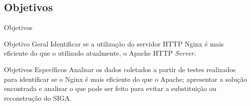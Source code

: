 \subsection*{Objetivos}
\begin{frame}{Objetivos}
	\begin{block}{Objetivo Geral}
		Identificar se a utilização do servidor HTTP Nginx é mais eficiente do 
		que o utilizado atualmente, o Apache HTTP \textit{Server}.
	\end{block} \pause
	\begin{block}{Objetivos Específicos}
		Analisar os dados coletados a partir de testes realizados para 
		identificar se o Nginx é mais eficiente do que o Apache; apresentar a 
		solução encontrada e analisar o que pode ser feito para evitar a 
		substituição ou reconstrução do SIGA.
	\end{block}
\end{frame}